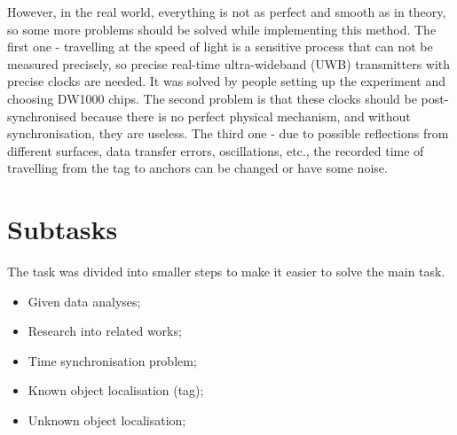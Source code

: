 \documentclass[journal]{IEEEtran}
\begin{document}
However, in the real world, everything is not as perfect and smooth as in theory, so some more problems should be solved while implementing this method.
The first one - travelling at the speed of light is a sensitive process that can not be measured precisely, so precise real-time ultra-wideband (UWB) transmitters with precise clocks are needed. 
It was solved by people setting up the experiment and choosing DW1000 chips.
The second problem is that these clocks should be post-synchronised because there is no perfect physical mechanism, and without synchronisation, they are useless.
The third one - due to possible reflections from different surfaces, data transfer errors, oscillations, etc., the recorded time of travelling from the tag to anchors can be changed or have some noise.

\section{Subtasks}
\label{sec:set_tasks}
The task was divided into smaller steps to make it easier to solve the main task.
\begin{itemize}
    \item Given data analyses;
    \item Research into related works;
    \item Time synchronisation problem;
    \item Known object localisation (tag);
    \item Unknown object localisation;
\end{itemize}

\end{document}
